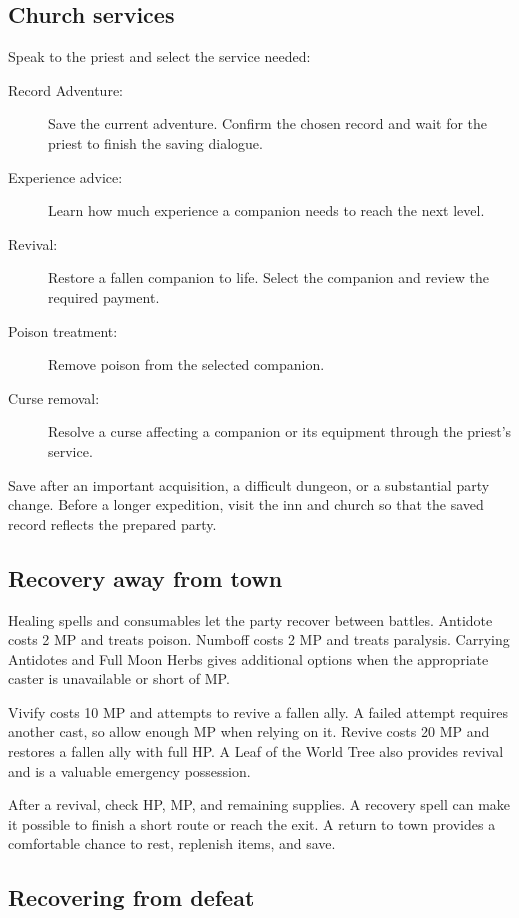 \subsection*{Church services}

Speak to the priest and select the service needed:
\begin{description}
  \item[Record Adventure:] Save the current adventure. Confirm the chosen
    record and wait for the priest to finish the saving dialogue.
  \item[Experience advice:] Learn how much experience a companion needs
    to reach the next level.
  \item[Revival:] Restore a fallen companion to life. Select the companion
    and review the required payment.
  \item[Poison treatment:] Remove poison from the selected companion.
  \item[Curse removal:] Resolve a curse affecting a companion or its
    equipment through the priest's service.
\end{description}

Save after an important acquisition, a difficult dungeon, or a substantial
party change. Before a longer expedition, visit the inn and church so
that the saved record reflects the prepared party.

\subsection*{Recovery away from town}

Healing spells and consumables let the party recover between battles.
Antidote costs 2 MP and treats poison. Numboff costs 2 MP and treats
paralysis. Carrying Antidotes and Full Moon Herbs gives additional options
when the appropriate caster is unavailable or short of MP.

Vivify costs 10 MP and attempts to revive a fallen ally. A failed attempt
requires another cast, so allow enough MP when relying on it. Revive costs
20 MP and restores a fallen ally with full HP. A Leaf of the World Tree
also provides revival and is a valuable emergency possession.

After a revival, check HP, MP, and remaining supplies. A recovery spell
can make it possible to finish a short route or reach the exit. A return
to town provides a comfortable chance to rest, replenish items, and save.

\subsection*{Recovering from defeat}

